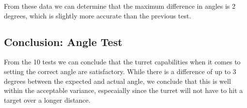 From these data we can determine that the maximum difference in angles is 2
degrees, which is slightly more accurate than the previous test.

\subsection{Conclusion: Angle Test}
From the 10 tests we can conclude that the turret capabilities when it comes to
setting the correct angle are satisfactory. While there is a difference of up to
3 degrees between the expected and actual angle, we conclude that this is well
within the acceptable variance, especaially since the turret will not have to
hit a target over a longer distance.   